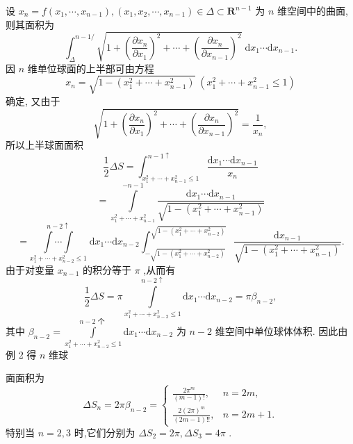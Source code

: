 \begin{solution}

\end{solution}
设 \({x}_{n} = f\left( {{x}_{1},\cdots ,{x}_{n - 1}}\right) ,\left( {{x}_{1},{x}_{2},\cdots ,{x}_{n - 1}}\right)  \in  \Delta  \subset  {\mathbf{R}}^{n - 1}\) 为 \(n\) 维空间中的曲面,则其面积为
\[
{\int }_{\Delta }^{n - 1/}\sqrt{1 + {\left( \frac{\partial {x}_{n}}{\partial {x}_{1}}\right) }^{2} + \cdots  + {\left( \frac{\partial {x}_{n}}{\partial {x}_{n - 1}}\right) }^{2}}\mathrm{\;d}{x}_{1}\cdots \mathrm{d}{x}_{n - 1}.
\]
因 \(n\) 维单位球面的上半部可由方程
\[
{x}_{n} = \sqrt{1 - \left( {{x}_{1}^{2} + \cdots  + {x}_{n - 1}^{2}}\right) }\;\left( {{x}_{1}^{2} + \cdots  + {x}_{n - 1}^{2} \leq  1}\right)
\]
确定, 又由于
\[
\sqrt{1 + {\left( \frac{\partial {x}_{n}}{\partial {x}_{1}}\right) }^{2} + \cdots  + {\left( \frac{\partial {x}_{n}}{\partial {x}_{n - 1}}\right) }^{2}} = \frac{1}{{x}_{n}},
\]
所以上半球面面积
\[
\frac{1}{2}{\Delta S} = {\int }_{{x}_{1}^{2} + \cdots  + {x}_{n - 1}^{2} \leq  1}^{n - 1 \uparrow  }\frac{\mathrm{d}{x}_{1}\cdots \mathrm{d}{x}_{n - 1}}{{x}_{n}}
\]
\[
= \mathop{\int }\limits_{{{x}_{1}^{2} + \cdots  + {x}_{n - 1}^{2}}}^{{-n - 1}}\frac{\mathrm{d}{x}_{1}\cdots \mathrm{d}{x}_{n - 1}}{\sqrt{1 - \left( {{x}_{1}^{2} + \cdots  + {x}_{n - 1}^{2}}\right) }}
\]
\[
= \underset{{x}_{1}^{2} + \cdots  + {x}_{n - 2}^{2} \leq  1}{\overset{n - 2 \uparrow  }{\int \cdots \int }}\mathrm{\;d}{x}_{1}\cdots \mathrm{d}{x}_{n - 2}{\int }_{-\sqrt{1 - \left( {{x}_{1}^{2} + \cdots  + {x}_{n - 2}^{2}}\right) }}^{\sqrt{1 - \left( {{x}_{1}^{2} + \cdots  + {x}_{n - 2}^{2}}\right) }}\frac{\mathrm{d}{x}_{n - 1}}{\sqrt{1 - \left( {{x}_{1}^{2} + \cdots  + {x}_{n - 1}^{2}}\right) }}.
\]
由于对变量 \({x}_{n - 1}\) 的积分等于 \(\pi\) ,从而有
\[
\frac{1}{2}{\Delta S} = \pi \mathop{\int }\limits_{{{x}_{1}^{2} + \cdots  + {x}_{n - 2}^{2} \leq  1}}^{{n - 2 \uparrow  }}\mathrm{d}{x}_{1}\cdots \mathrm{d}{x}_{n - 2} = \pi {\beta }_{n - 2},
\]
其中 \({\beta }_{n - 2} = \mathop{\int }\limits_{{{x}_{1}^{2} + \cdots  + {x}_{n - 2}^{2} \leq  1}}^{{n - 2\text{ 个 }}}\mathrm{d}{x}_{1}\cdots \mathrm{d}{x}_{n - 2}\) 为 \(n - 2\) 维空间中单位球体体积. 因此由例 2 得 \(n\) 维球

面面积为
\[
\Delta {S}_{n} = {2\pi }{\beta }_{n - 2} = \left\{  \begin{array}{ll} \frac{2{\pi }^{m}}{\left( {m - 1}\right) !}, & n = {2m}, \\  \frac{2{\left( 2\pi \right) }^{m}}{\left( {{2m} - 1}\right) !!}, & n = {2m} + 1. \end{array}\right.
\]
特别当 \(n = 2,3\) 时,它们分别为 \(\Delta {S}_{2} = {2\pi },\Delta {S}_{3} = {4\pi }\) .

